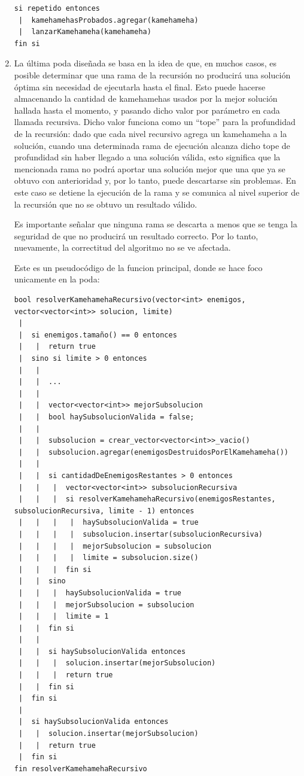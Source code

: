 \begin{enumerate}
\begin{codesnippet}
\begin{verbatim}
si repetido entonces
 |  kamehamehasProbados.agregar(kamehameha)
 |  lanzarKamehameha(kamehameha)
fin si
        \end{verbatim}
        \end{codesnippet}

        \item La última poda diseñada se basa en la idea de que, en muchos casos, es posible determinar que una rama de la recursión no producirá una solución óptima sin necesidad de ejecutarla hasta el final. Esto puede hacerse almacenando la cantidad de kamehamehas usados por la mejor solución hallada hasta el momento, y pasando dicho valor por parámetro en cada llamada recursiva. Dicho valor funciona como un ``tope'' para la profundidad de la recursión: dado que cada nivel recursivo agrega un kamehameha a la solución, cuando una determinada rama de ejecución alcanza dicho tope de profundidad sin haber llegado a una solución válida, esto significa que la mencionada rama no podrá aportar una solución mejor que una que ya se obtuvo con anterioridad y, por lo tanto, puede descartarse sin problemas. En este caso se detiene la ejecución de la rama y se comunica al nivel superior de la recursión que no se obtuvo un resultado válido.

        Es importante señalar que ninguna rama se descarta a menos que se tenga la seguridad de que no producirá un resultado correcto. Por lo tanto, nuevamente, la correctitud del algoritmo no se ve afectada.

        Este es un pseudocódigo de la funcion principal, donde se hace foco unicamente en la poda:

        \begin{codesnippet}
        \begin{verbatim}
bool resolverKamehamehaRecursivo(vector<int> enemigos, vector<vector<int>> solucion, limite)
 |
 |  si enemigos.tamaño() == 0 entonces
 |   |  return true
 |  sino si limite > 0 entonces
 |   |
 |   |  ...
 |   |
 |   |  vector<vector<int>> mejorSubsolucion
 |   |  bool haySubsolucionValida = false;
 |   |
 |   |  subsolucion = crear_vector<vector<int>>_vacio()
 |   |  subsolucion.agregar(enemigosDestruidosPorElKamehameha())
 |   |
 |   |  si cantidadDeEnemigosRestantes > 0 entonces
 |   |   |  vector<vector<int>> subsolucionRecursiva
 |   |   |  si resolverKamehamehaRecursivo(enemigosRestantes, subsolucionRecursiva, limite - 1) entonces
 |   |   |   |  haySubsolucionValida = true
 |   |   |   |  subsolucion.insertar(subsolucionRecursiva)
 |   |   |   |  mejorSubsolucion = subsolucion
 |   |   |   |  limite = subsolucion.size()
 |   |   |  fin si
 |   |  sino
 |   |   |  haySubsolucionValida = true
 |   |   |  mejorSubsolucion = subsolucion
 |   |   |  limite = 1
 |   |  fin si
 |   |
 |   |  si haySubsolucionValida entonces
 |   |   |  solucion.insertar(mejorSubsolucion)
 |   |   |  return true
 |   |  fin si
 |  fin si
 |
 |  si haySubsolucionValida entonces
 |   |  solucion.insertar(mejorSubsolucion)
 |   |  return true
 |  fin si
fin resolverKamehamehaRecursivo
        \end{verbatim}
        \end{codesnippet}


\end{enumerate}
